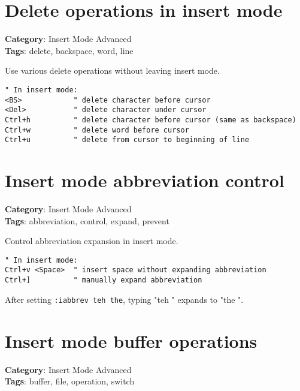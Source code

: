 {{{{{\section{Delete operations in insert mode}

\textbf{Category}: Insert Mode Advanced\\ \textbf{Tags}: delete, backspace, word, line
\vspace{0.5cm}

Use various delete operations without leaving insert mode.

\begin{Exa*}{}
\begin{Verbatim}[fontsize=\footnotesize, breaklines, breakanywhere]
" In insert mode:
<BS>            " delete character before cursor
<Del>           " delete character under cursor
Ctrl+h          " delete character before cursor (same as backspace)
Ctrl+w          " delete word before cursor
Ctrl+u          " delete from cursor to beginning of line
\end{Verbatim}
\end{Exa*}

\section{Insert mode abbreviation control}

\textbf{Category}: Insert Mode Advanced\\ \textbf{Tags}: abbreviation, control, expand, prevent
\vspace{0.5cm}

Control abbreviation expansion in insert mode.

\begin{Exa*}{}
\begin{Verbatim}[fontsize=\footnotesize, breaklines, breakanywhere]
" In insert mode:
Ctrl+v <Space>  " insert space without expanding abbreviation
Ctrl+]          " manually expand abbreviation
\end{Verbatim}
\end{Exa*}

After setting {\footnotesize \Verb§:iabbrev teh the§}, typing "teh " expands to "the ".

\section{Insert mode buffer operations}

\textbf{Category}: Insert Mode Advanced\\ \textbf{Tags}: buffer, file, operation, switch
\vspace{0.5cm}

}}}}}
